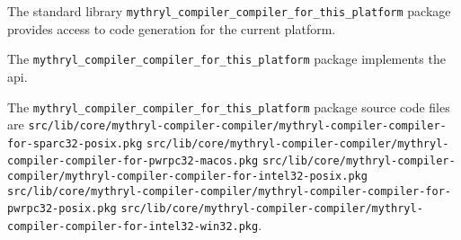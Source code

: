 
The standard library {\tt mythryl\_compiler\_compiler\_for\_this\_platform} package provides access 
to code generation for the current platform.

The {\tt mythryl\_compiler\_compiler\_for\_this\_platform} package implements the  api.

The {\tt mythryl\_compiler\_compiler\_for\_this\_platform} package source code files are 
{\tt src/lib/core/mythryl-compiler-compiler/mythryl-compiler-compiler-for-sparc32-posix.pkg} 
{\tt src/lib/core/mythryl-compiler-compiler/mythryl-compiler-compiler-for-pwrpc32-macos.pkg} 
{\tt src/lib/core/mythryl-compiler-compiler/mythryl-compiler-compiler-for-intel32-posix.pkg} 
{\tt src/lib/core/mythryl-compiler-compiler/mythryl-compiler-compiler-for-pwrpc32-posix.pkg} 
{\tt src/lib/core/mythryl-compiler-compiler/mythryl-compiler-compiler-for-intel32-win32.pkg}.


